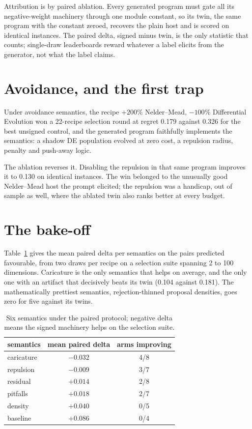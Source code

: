 \documentclass[11pt]{article}
\begin{document}
Attribution is by paired ablation. Every generated program must gate all
its negative-weight machinery through one module constant, so its twin, the
same program with the constant zeroed, recovers the plain host and is
scored on identical instances. The paired delta, signed minus twin, is the
only statistic that counts; single-draw leaderboards reward whatever a
label elicits from the generator, not what the label claims.

\section{Avoidance, and the first trap}

Under avoidance semantics, the recipe $+200\%$ Nelder--Mead, $-100\%$
Differential Evolution won a 22-recipe selection round at regret 0.179
against 0.326 for the best unsigned control, and the generated program
faithfully implements the semantics: a shadow DE population evolved at zero
cost, a repulsion radius, penalty and push-away logic.

The ablation reverses it. Disabling the repulsion in that same program
improves it to 0.130 on identical instances. The win belonged to the
unusually good Nelder--Mead host the prompt elicited; the repulsion was a
handicap, out of sample as well, where the ablated twin also ranks better
at every budget.

\section{The bake-off}

Table~\ref{tab:sem} gives the mean paired delta per semantics on the pairs
predicted favourable, from two draws per recipe on a selection suite
spanning 2 to 100 dimensions. Caricature is the only semantics that helps
on average, and the only one with an artifact that decisively beats its
twin (0.104 against 0.181). The mathematically prettiest semantics,
rejection-thinned proposal densities, goes zero for five against its twins.

\begin{table}[h]
\centering
\begin{tabular}{lcc}
\toprule
semantics & mean paired delta & arms improving \\
\midrule
caricature & $-0.032$ & 4/8 \\
repulsion  & $-0.009$ & 3/7 \\
residual   & $+0.014$ & 2/8 \\
pitfalls   & $+0.018$ & 2/7 \\
density    & $+0.040$ & 0/5 \\
baseline   & $+0.086$ & 0/4 \\
\bottomrule
\end{tabular}
\caption{Six semantics under the paired protocol; negative delta means the
signed machinery helps on the selection suite.}
\label{tab:sem}
\end{table}
\end{document}
